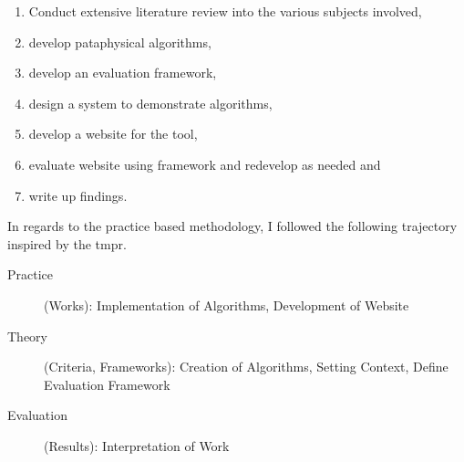 \begin{enumerate}
  \item Conduct extensive literature review into the various subjects involved,
  \item develop pataphysical algorithms,
  \item develop an evaluation framework,
  \item design a system to demonstrate algorithms,
  \item develop a website for the tool,
  \item evaluate website using framework and redevelop as needed and
  \item write up findings.
\end{enumerate}

In regards to the practice based methodology, I followed the following trajectory inspired by the \gls{tmpr}.


\begin{description}
  \item [Practice] (Works): Implementation of Algorithms, Development of Website
  \item [Theory] (Criteria, Frameworks): Creation of Algorithms, Setting Context, Define Evaluation Framework
  \item [Evaluation] (Results): Interpretation of Work
\end{description}

\stopcontents[chapters]

